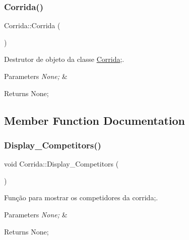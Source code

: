 \subsubsection{\texorpdfstring{Corrida()}{Corrida()}}
{\footnotesize\ttfamily Corrida\+::\+Corrida (\begin{DoxyParamCaption}{ }\end{DoxyParamCaption})}



Destrutor de objeto da classe \mbox{\hyperlink{class_corrida}{Corrida}};. 


\begin{DoxyParams}{Parameters}
{\em None;} & \\
\hline
\end{DoxyParams}
\begin{DoxyReturn}{Returns}
None; 
\end{DoxyReturn}


\subsection{Member Function Documentation}
\mbox{\label{class_corrida_a23465aa00504a4f1ac6db74cac94562b}} 
\subsubsection{\texorpdfstring{Display\+\_\+\+Competitors()}{Display\_Competitors()}}
{\footnotesize\ttfamily void Corrida\+::\+Display\+\_\+\+Competitors (\begin{DoxyParamCaption}{ }\end{DoxyParamCaption})}



Função para mostrar os competidores da corrida;. 


\begin{DoxyParams}{Parameters}
{\em None;} & \\
\hline
\end{DoxyParams}
\begin{DoxyReturn}{Returns}
None; 
\end{DoxyReturn}
\mbox{\label{class_corrida_a2023bf935b17595f4140083dd1027b38}} 
